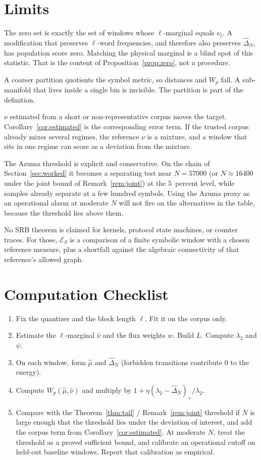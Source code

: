 \documentclass[11pt,reqno]{amsart}
\theoremstyle{remark}
\newcommand{\ES}{\mathcal{E}_S}
\begin{document}
\section{Limits}\label{sec:limits}

The zero set is exactly the set of windows whose $\ell$-marginal equals $\nu_\ell$. A modification that preserves $\ell$-word frequencies, and therefore also preserves $\hat\Delta_N$, has population score zero. Matching the physical marginal is a blind spot of this statistic. That is the content of Proposition~\ref{prop:zero}, not a procedure.

A coarser partition quotients the symbol metric, so distances and $W_p$ fall. A sub-manifold that lives inside a single bin is invisible. The partition is part of the definition.

$\nu$ estimated from a short or non-representative corpus moves the target. Corollary~\ref{cor:estimated} is the corresponding error term. If the trusted corpus already mixes several regimes, the reference $\nu$ is a mixture, and a window that sits in one regime can score as a deviation from the mixture.

The Azuma threshold is explicit and conservative. On the chain of Section~\ref{sec:worked} it becomes a separating test near $N = 57000$ (or $N \approx 16400$ under the joint bound of Remark~\ref{rem:joint}) at the $5$~percent level, while samples already separate at a few hundred symbols. Using the Azuma proxy as an operational alarm at moderate $N$ will not fire on the alternatives in the table, because the threshold lies above them.

No SRB theorem is claimed for kernels, protocol state machines, or counter traces. For those, $\ES$ is a comparison of a finite symbolic window with a chosen reference measure, plus a shortfall against the algebraic connectivity of that reference's allowed graph.

\section{Computation Checklist}\label{sec:checklist}

\begin{enumerate}
\item Fix the quantizer and the block length $\ell$. Fit it on the corpus only.
\item Estimate the $\ell$-marginal $\hat\nu$ and the flux weights $w$. Build $L$. Compute $\lambda_2$ and $\psi$.
\item On each window, form $\hat\mu$ and $\hat\Delta_N$ (forbidden transitions contribute $0$ to the energy).
\item Compute $W_p(\hat\mu, \hat\nu)$ and multiply by $1 + \eta (\lambda_2 - \hat\Delta_N)_+/\lambda_2$.
\item Compare with the Theorem~\ref{thm:tail} / Remark~\ref{rem:joint} threshold if $N$ is large enough that the threshold lies under the deviation of interest, and add the corpus term from Corollary~\ref{cor:estimated}. At moderate $N$, treat the threshold as a proved sufficient bound, and calibrate an operational cutoff on held-out baseline windows. Report that calibration as empirical.
\end{enumerate}
\end{document}
